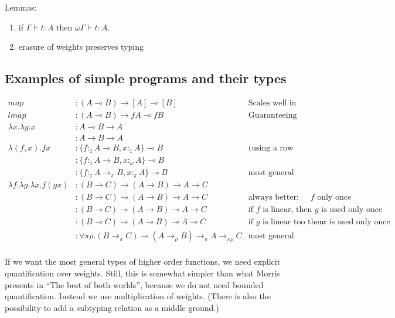 \documentclass[11pt]{article}
\begin{document}
Lemmas:
\begin{enumerate}
\item if \(Γ ⊢ t : A\) then \(ωΓ ⊢ t : A\).
\item erasure of weights preserves typing
\end{enumerate}

\subsection{Examples of simple programs and their types}

\hspace{-4cm}\begin{minipage}{\textwidth}
\begin{align*}
map & : (A ⊸ B) → [A] ⊸ [B] & \text{Scales well in unrestricted contexts}\\
lmap & : (A ⊸ B) → f A ⊸ f B & \text{Guaranteeing that no element is lost} \\
λx. λy. x & : A ⊸ B → A \\
          & : A → B → A \\
λ(f,x). f x & : \{f :_1 A ⊸ B, x :_1 A\} ⊸ B & \text{(using a row type for concision)}\\
            & : \{f :_1 A → B, x :_ω A\} ⊸ B \\
            & : \{f :_1 A →_π B, x :_π A\} ⊸ B & \text{most general type} \\
λf. λg. λx. f (g x) & : (B → C) → (A → B) → A → C \\
                    & : (B → C) ⊸ (A → B) → A → C & \text {always better: comp uses $f$  only once} \\
                    & : (B ⊸ C) ⊸ (A → B) ⊸ A → C & \text {if $f$ is linear, then $g$ is used only once} \\
                    & : (B ⊸ C) ⊸ (A ⊸ B) ⊸ A ⊸ C & \text {if $g$ is linear too then $x$ is used only once} \\
                    & : ∀ π ρ. (B →_π C) ⊸ (A →_ρ B) →_π A →_{πρ} C & \text{most general type} \\
\end{align*}
\end{minipage}


If we want the most general types of higher order functions, we need
explicit quantification over weights. Still, this is somewhat simpler
than what Morris presents in ``The best of both worlds'', because we
do not need bounded quantification. Instead we use multiplication of
weights. (There is also the possibility to add a subtyping relation as
a middle ground.)
\end{document}
